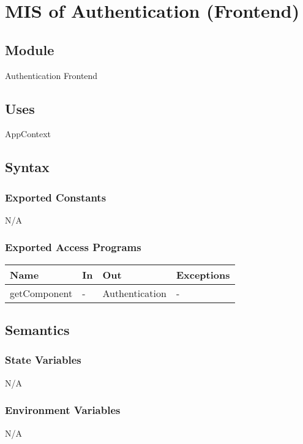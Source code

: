 \documentclass[12pt, titlepage]{article}
\begin{document}
\newpage

\section{MIS of Authentication (Frontend)} \label{auth}

\subsection{Module}

Authentication Frontend

\subsection{Uses}
AppContext

\subsection{Syntax}

\subsubsection{Exported Constants}
N/A

\subsubsection{Exported Access Programs}

\begin{center}
    \begin{tabular}{p{3cm} p{4cm} p{4cm} p{2cm}}
    \hline
    \textbf{Name} & \textbf{In} & \textbf{Out} & \textbf{Exceptions} \\
    \hline
    getComponent & - & Authentication & - \\
    \hline
    \end{tabular}
\end{center}

\subsection{Semantics}

\subsubsection{State Variables}
N/A

\subsubsection{Environment Variables}
N/A
\end{document}
